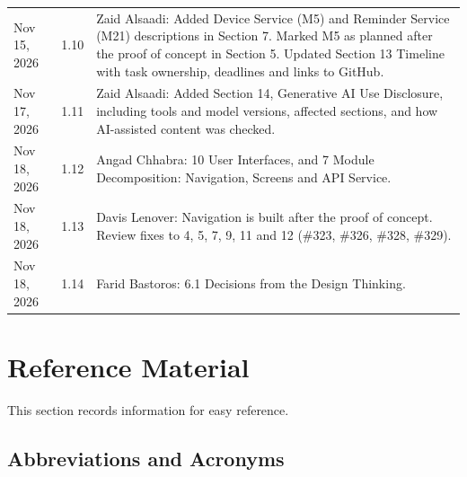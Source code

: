 \documentclass[12pt, titlepage]{article}
\begin{document}
\begin{xltabular}{\textwidth}{p{3cm}p{2cm}X}
Nov 15, 2026 & 1.10 & Zaid Alsaadi: Added Device Service (M5) and
Reminder Service (M21) descriptions in Section 7. Marked M5 as planned
after the proof of concept in Section 5. Updated Section 13 Timeline
with task ownership, deadlines and links to GitHub.\\
Nov 17, 2026 & 1.11 & Zaid Alsaadi: Added Section 14, Generative AI
Use Disclosure, including tools and model versions, affected sections,
and how AI-assisted content was checked.\\
Nov 18, 2026 & 1.12 & Angad Chhabra: 10 User Interfaces, and 7 Module
Decomposition: Navigation, Screens and API Service.\\
Nov 18, 2026 & 1.13 & Davis Lenover: Navigation is built after the proof of
concept. Review fixes to 4, 5, 7, 9, 11 and 12 (\#323, \#326, \#328, \#329).\\
Nov 18, 2026 & 1.14 & Farid Bastoros: 6.1 Decisions from the Design Thinking.\\
\bottomrule
\end{xltabular}

\newpage

\section{Reference Material}

This section records information for easy reference. 

\subsection{Abbreviations and Acronyms}
\end{document}

